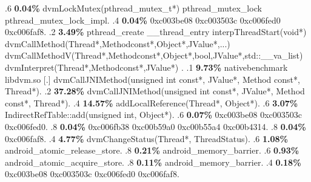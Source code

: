 \begin{profile}
{.6 \textbf{0.04\%} dvmLockMutex(pthread\_mutex\_t*)\newline {} pthread\_mutex\_lock\newline {} pthread\_mutex\_lock\_impl. 
.4 \textbf{0.04\%} 0xc003be08\newline {} 0xc003503c\newline {} 0xc006fed0\newline {} 0xc006faf8. 
.2 \textbf{3.49\%} pthread\_create\newline {} \_\_thread\_entry\newline {} interpThreadStart(void*)\newline {} dvmCallMethod(Thread*,Methodconst*,Object*,JValue*,...)\newline {} dvmCallMethodV(Thread*,Methodconst*,Object*,bool,JValue*,std::\_\_va\_list)\newline {} dvmInterpret(Thread*,Methodconst*,JValue*)\newline {} . 
.1 \textbf{ 9.73\%} nativebenchmark  libdvm.so              [.] dvmCallJNIMethod(unsigned int const*, JValue*, Method const*, Thread*). 
.2 \textbf{37.28\%} dvmCallJNIMethod(unsigned int const*, JValue*, Method const*, Thread*). 
.4 \textbf{14.57\%} addLocalReference(Thread*, Object*). 
.6 \textbf{3.07\%} IndirectRefTable::add(unsigned int, Object*). 
.6 \textbf{0.07\%} 0xc003be08\newline {} 0xc003503c\newline {} 0xc006fed0. 
.8 \textbf{0.04\%} 0xc006fb38\newline {} 0xc00b59a0\newline {} 0xc00b55a4\newline {} 0xc00b4314. 
.8 \textbf{0.04\%} 0xc006faf8. 
.4 \textbf{4.77\%} dvmChangeStatus(Thread*, ThreadStatus). 
.6 \textbf{1.08\%} android\_atomic\_release\_store. 
.8 \textbf{0.21\%} android\_memory\_barrier. 
.6 \textbf{0.93\%} android\_atomic\_acquire\_store. 
.8 \textbf{0.11\%} android\_memory\_barrier. 
.4 \textbf{0.18\%} 0xc003be08\newline {} 0xc003503c\newline {} 0xc006fed0\newline {} 0xc006faf8. 
}
\end{profile}
